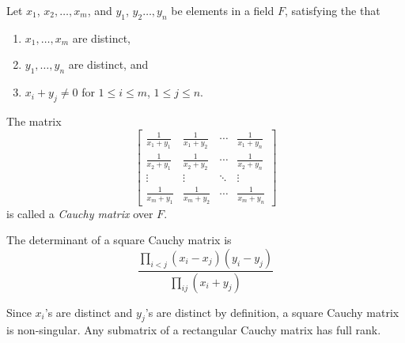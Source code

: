 \documentclass[12pt]{article}
\begin{document}
Let $x_1$, $x_2,\ldots, x_m$, and $y_1$, $y_2 \ldots, y_n$ be elements in a field $F$, satisfying the  that

\begin{enumerate}
\item $x_1, \ldots, x_m$ are distinct,

\item $y_1, \ldots, y_n$ are distinct, and

\item $x_i+y_j\neq 0$ for $1\leq i \leq m$, $1\leq j \leq n$.
\end{enumerate}

The matrix
\[
\begin{bmatrix}
\frac{1}{x_1+y_1} & \frac{1}{x_1+y_2} & \cdots &\frac{1}{x_1+y_n} \\
\frac{1}{x_2+y_1} & \frac{1}{x_2+y_2} & \cdots &\frac{1}{x_2+y_n} \\
\vdots & \vdots & \ddots & \vdots \\
\frac{1}{x_m+y_1} & \frac{1}{x_m+y_2} & \cdots &\frac{1}{x_m+y_n}
\end{bmatrix}
\]
is called a {\em Cauchy matrix} over $F$.

\bigskip

The determinant of a square Cauchy matrix is
\[
\frac{ \prod_{i<j} (x_i-x_j)(y_i-y_j) } {\prod_{ij} (x_i+y_j)}
\]

Since $x_i$'s are distinct and $y_j$'s are distinct by definition, a square Cauchy matrix is non-singular. Any submatrix of a rectangular Cauchy matrix has full rank.
\end{document}
